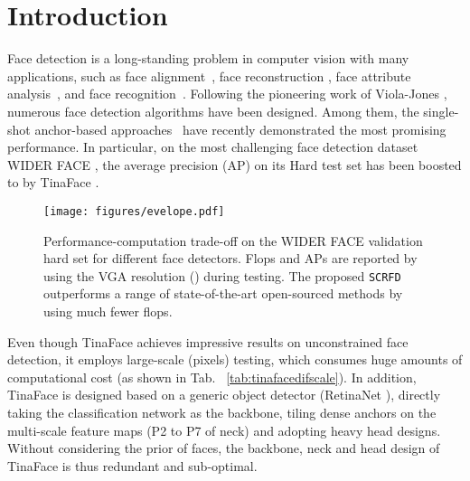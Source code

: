 \documentclass[10pt,twocolumn,letterpaper]{article}
\newcommand{\dsname}[1]{\texttt{\small #1}\xspace}
\newcommand{\scrfd}{\dsname{SCRFD}}
\begin{document}
\section{Introduction}
Face detection is a long-standing problem in computer vision with many applications, such as face alignment~\cite{bulat2017far}, face reconstruction \cite{feng2018joint}, face attribute analysis~\cite{zhang2018jointexpression,pan2018mean}, and face recognition~\cite{schroff2015facenet,deng2018arcface}.
Following the pioneering work of Viola-Jones \cite{viola2004robust}, numerous face detection algorithms have been designed. 
Among them, the single-shot anchor-based approaches~\cite{najibi2017ssh,zhang2017s3fd,tang2018pyramidbox,li2019dsfd,ming2019group,deng2019retinaface,liu2019hambox,zhu2020tinaface} have recently demonstrated the most promising performance. In particular, on the most challenging face detection dataset WIDER FACE \cite{yang2016wider}, the average precision (AP) on its Hard test set has been boosted to  by TinaFace \cite{zhu2020tinaface}. 

\begin{figure}[t!]
\centering
\texttt{[image: figures/evelope.pdf]}
\caption{Performance-computation trade-off on the WIDER FACE validation hard set for different face detectors. Flops and APs are reported by using the VGA resolution () during testing. The proposed \scrfd outperforms a range of state-of-the-art open-sourced methods by using much fewer flops.}
\vspace{-4mm}
\label{fig:evelope}
\end{figure}

Even though TinaFace \cite{zhu2020tinaface} achieves impressive results on unconstrained face detection, it employs large-scale (\eg  pixels) testing, which consumes huge amounts of computational cost (as shown in Tab.~ \ref{tab:tinafacedifscale}). In addition, TinaFace is designed based on a generic object detector (\ie RetinaNet \cite{lin2017focal}), directly taking the classification network as the backbone, tiling dense anchors on the multi-scale feature maps (\ie P2 to P7 of neck) and adopting heavy head designs. Without considering the prior of faces, the backbone, neck and head design of TinaFace is thus redundant and sub-optimal. 
\end{document}
